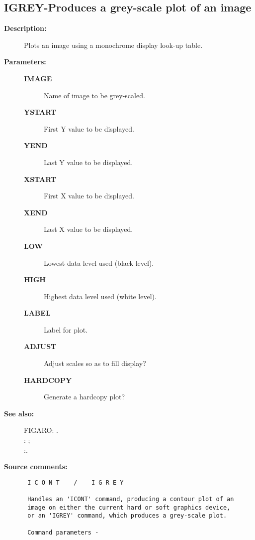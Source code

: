 \subsection{IGREY-\label{IGREY}Produces a grey-scale plot of an image}
\begin{description}

\item [{\bf Description:}]
 Plots an image using a monochrome display look-up table.

\item [{\bf Parameters:}]
\begin{description}
\item [{\bf IMAGE}]
 Name of image to be grey-scaled.
\item [{\bf YSTART}]
 First Y value to be displayed.
\item [{\bf YEND}]
 Last Y value to be displayed.
\item [{\bf XSTART}]
 First X value to be displayed.
\item [{\bf XEND}]
 Last X value to be displayed.
\item [{\bf LOW}]
 Lowest data level used (black level).
\item [{\bf HIGH}]
 Highest data level used (white level).
\item [{\bf LABEL}]
 Label for plot.
\item [{\bf ADJUST}]
 Adjust scales so as to fill display?
\item [{\bf HARDCOPY}]
 Generate a hardcopy plot?
\end{description}

\item [{\bf See also:}]
FIGARO: .\\
: ;\\
:.\\

\item [{\bf Source comments:}]
\begin{verbatim}
 I C O N T    /    I G R E Y

 Handles an 'ICONT' command, producing a contour plot of an
 image on either the current hard or soft graphics device,
 or an 'IGREY' command, which produces a grey-scale plot.

 Command parameters -


\end{verbatim}
\end{description}
